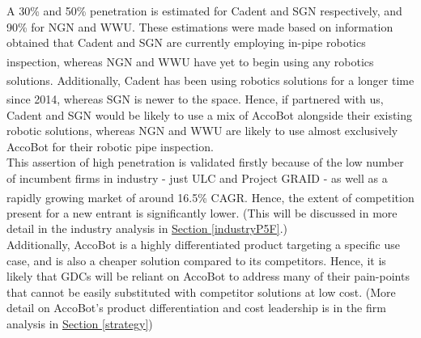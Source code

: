 \documentclass[11pt]{article}		%
\newcommand{\supercite}[1]{\textsuperscript{\cite{#1}}}		%
\newcommand{\sectref}[1]{\hyperref[#1]{Section \ref*{#1}}}     %
\begin{document}
    \hspace*{2ex} A 30\% and 50\% penetration is estimated for Cadent and SGN respectively, and 90\% for NGN and WWU. These estimations were made based on information obtained that Cadent and SGN are currently employing in-pipe robotics inspection\supercite{cadentbot}\supercite{SGNbot}, whereas NGN and WWU have yet to begin using any robotics solutions\supercite{NGNbot}\supercite{WWUbot}. Additionally, Cadent has been using robotics solutions for a longer time since 2014\supercite{cadentbot}, whereas SGN is newer to the space\supercite{SGNbot}. Hence, if partnered with us, Cadent and SGN would be likely to use a mix of AccoBot alongside their existing robotic solutions, whereas NGN and WWU are likely to use almost exclusively AccoBot for their robotic pipe inspection.
    \\
    \hspace*{2ex}This assertion of high penetration is validated firstly because of the low number of incumbent firms in industry - just ULC and Project GRAID - as well as a rapidly growing market of around 16.5\% CAGR\supercite{inpipemkt}. Hence, the extent of competition present for a new entrant is significantly lower. (This will be discussed in more detail in the industry analysis in \sectref{industryP5F}.) 
    \\
    \hspace*{2ex}Additionally, AccoBot is a highly differentiated product targeting a specific use case, and is also a cheaper solution compared to its competitors. Hence, it is likely that GDCs will be reliant on AccoBot to address many of their pain-points that cannot be easily substituted with competitor solutions at low cost. (More detail on AccoBot's product differentiation and cost leadership is in the firm analysis in \sectref{strategy})
    
\end{document}
